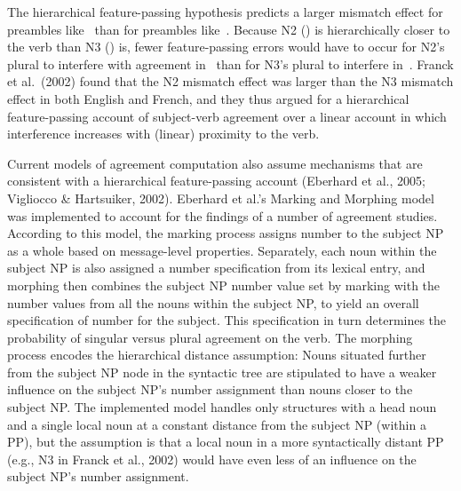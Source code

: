 \documentclass[12pt,titlepage]{article}
\newcommand{\NOTE}[1]{\textbf{*** #1 ***}}  %
\newcommand{\IGNORE}[1]{} %
\begin{document}
The hierarchical feature-passing hypothesis predicts a larger mismatch
effect for preambles like~ than for preambles
like~.  Because N2 () is hierarchically
closer to the verb than N3 () is, fewer feature-passing
errors would have to occur for N2's plural to interfere with agreement
in~ than for N3's plural to interfere
in~.  Franck et al.\ (2002) found that the N2 mismatch
effect was larger than the N3 mismatch effect in both English and French,
and they thus argued for a hierarchical feature-passing account of
subject-verb agreement over a linear account in which interference
increases with (linear) proximity to the verb.\IGNORE{ \NOTE{there's an
issue in the above arg that's largely ignored (by us and others), which is
whether it's overall distance that matters (M\&M basically assumes this;
Franck et al.\ sometimes suggest this), versus the number of nodes that
would have to incorrectly pass number up/along (so NP might not be such a
node, b/c number should be allowed to pass up outside of it; but PP would
be such a node (Franck et al.'s figs 1\&2 suggest this using bold vs roman)
-- this is on analogy to Romance languages, where the P sometimes needs to
be num-marked from N w/in the PP)\ldots I think we should probably not
discuss this here, but it might be relevant for the GD\ldots}}

Current models of agreement computation also assume mechanisms that are
consistent with a hierarchical feature-passing account (Eberhard et al.,
2005; Vigliocco \& Hartsuiker, 2002).  Eberhard et al.'s Marking and
Morphing model was implemented to account for the findings of a number of
agreement studies.  According to this model, the marking process assigns
number to the subject NP as a whole based on message-level
properties\IGNORE{ (this allows conceptual number of the subject phrase to
have an influence independent of the lexically-specified number of any
nouns within the phrase)}.  Separately, each noun within the subject NP is
also assigned a number specification from its lexical entry, and morphing
then combines the subject NP number value set by marking with the number
values from all the nouns within the subject NP, to yield an overall
specification of number for the subject.  This specification in turn
determines the probability of singular versus plural agreement on the verb.
The morphing process encodes the hierarchical distance assumption: Nouns
situated further from the subject NP node in the syntactic tree are
stipulated to have a weaker influence on the subject NP's number assignment
than nouns closer to the subject NP\@.  The implemented model handles only
structures with a head noun and a single local noun at a constant distance
from the subject NP (within a PP), but the assumption is that a local noun
in a more syntactically distant PP (e.g., N3 in Franck et al., 2002) would
have even less of an influence on the subject NP's number assignment.
\end{document}
